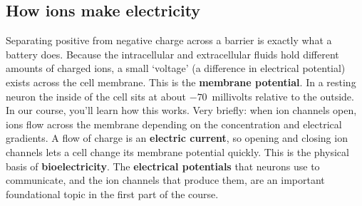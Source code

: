 \subsection{How ions make electricity}
Separating positive from negative charge across a barrier is exactly what a
battery does. Because the intracellular and extracellular fluids hold different
amounts of charged ions, a small `voltage' (a difference in electrical potential)
exists across the cell membrane. This is the \textbf{membrane potential}. In
a resting neuron the inside of the cell sits at about $-70$~millivolts relative
to the outside. In our course, you'll learn how this works. Very briefly: when
ion channels open, ions flow across the membrane depending on the
concentration and electrical gradients. A flow of charge is an \textbf{electric current},
so opening and closing ion channels lets a cell change its membrane potential
quickly. This is the physical basis of \textbf{bioelectricity}. The \textbf{electrical
potentials} that neurons use to communicate, and the ion
channels that produce them, are an important foundational topic in the first part
of the course.
